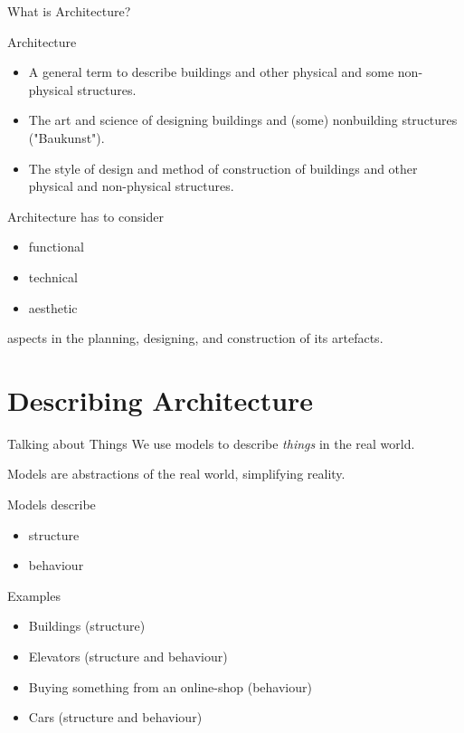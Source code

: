 \begin{frame}{What is Architecture?}
   \begin{block}{Architecture}
       \begin{itemize}
           \item A general term to describe buildings and other physical and some non-physical structures.
           \item The art and science of designing buildings and (some) nonbuilding structures ("Baukunst").
           \item The style of design and method of construction of buildings and other physical and non-physical structures.
   \end{itemize}
\end{block}

   Architecture has to consider
   \begin{itemize}
      \item functional
      \item technical
      \item aesthetic
   \end{itemize}
   aspects in the planning, designing, and construction of its artefacts.
\end{frame}


\section{Describing Architecture}


\begin{frame}{Talking about Things}
      We use \glspl{model} to describe \emph{things} in the real world. 

  \vspace*{1ex}
  Models are abstractions of the real world, simplifying reality.
  
\vspace*{1ex}
   Models describe 
   \begin{itemize}
      \item \Gls{structure}
      \item \Gls{behaviour}
   \end{itemize}

  \vspace*{1ex} 
   Examples
   \begin{itemize}
      \item Buildings (structure)
      \item Elevators (structure and behaviour)
      \item Buying something from an online-shop (behaviour)
      \item Cars (structure and behaviour)
   \end{itemize}
  
\end{frame}

